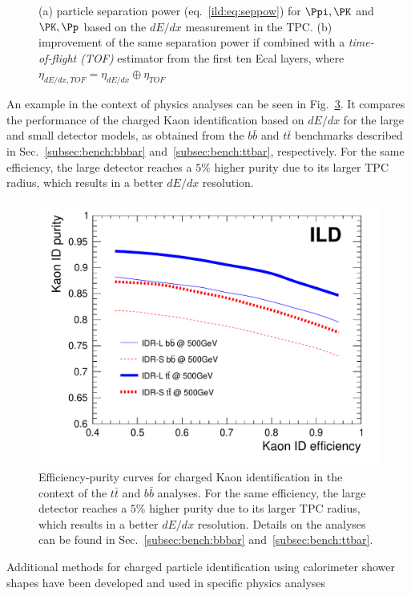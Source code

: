 \begin{figure}[htbp]
\begin{subfigure}{0.49\hsize}
 \caption{  \label{fig:perf:dedxtof_sep}}
 \end{subfigure}
\caption{ (a) particle separation power (eq.~\ref{ild:eq:seppow}) for $\Ppi,\PK$ and $\PK,\Pp$ based on the $dE/dx$ measurement in the TPC.
  (b) improvement of the same separation power if combined with a {\em time-of-flight (TOF)} estimator from the first ten Ecal layers,
  where $\eta_{dE/dx,TOF}=\eta_{dE/dx} \oplus \eta_{TOF}$
}
\label{fig:perf:dedxtof}
\end{figure}

An example in the context of physics analyses can be seen in Fig.~\ref{fig:perf:KaonID}. It compares the performance of the charged Kaon identification based on $dE/dx$ for the large and small detector models, as obtained from the $b\bar{b}$ and $t\bar{t}$ benchmarks described in Sec.~\ref{subsec:bench:bbbar} and~\ref{subsec:bench:ttbar}, respectively. For the same efficiency, the large detector reaches a $5\%$ higher purity due to its larger TPC radius, which results in a better $dE/dx$ resolution.
\begin{figure}[b!]
  \includegraphics[width=0.8\hsize]{Performance/fig/kaonIDeff_v2-eps-converted-to.pdf}
  \caption{\label{fig:perf:KaonID}
    Efficiency-purity curves for charged Kaon identification in the context of the $t\bar{t}$ and $b\bar{b}$ analyses. For the same
    efficiency, the large detector reaches a $5\%$ higher purity due to its larger TPC radius, which results in a better $dE/dx$
    resolution. Details on the analyses can be found in Sec.~\ref{subsec:bench:bbbar} and~\ref{subsec:bench:ttbar}.
  }
\end{figure}
Additional methods for charged particle identification using calorimeter shower shapes have been developed and used in specific physics analyses~

